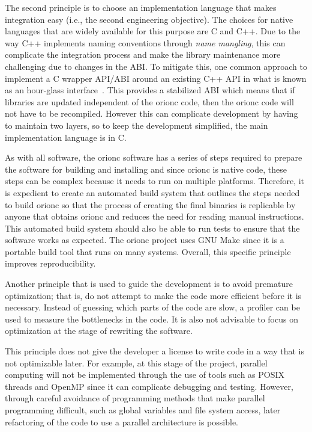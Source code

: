 The second principle is to choose an implementation language that
makes integration easy (i.e., the second engineering objective).
The choices for native languages that are widely available for
this purpose are C and C++. Due to the way C++ implements
naming conventions through \emph{name mangling}, this can
complicate the integration process and make the library
maintenance more challenging due to changes in the \acrshort{ABI}.
To mitigate this, one common approach to implement a C wrapper
\acrshort{API}/\acrshort{ABI} around an existing C++ \acrshort{API}
in what is known as an hour-glass interface~\autocite{CppCon:Hourglass:2014}.
This provides a stabilized \acrshort{ABI} which means that if
libraries are updated independent of the \gls{orionc} code, then
the \gls{orionc} code will not have to be recompiled. However this can
complicate development by having to maintain two layers, so to
keep the development simplified, the main implementation language
is in C.

As with all software, the \gls{orionc} software has a series of
steps required to prepare the software for building and
installing and since \gls{orionc} is native code, these steps can
be complex because it needs to run on multiple platforms. Therefore,
it is expedient to create an automated build system that outlines
the steps needed to build \gls{orionc} so that the process of
creating the final binaries is replicable by anyone that obtains
\gls{orionc} and reduces the need for reading manual instructions.
This automated build system should also be able to run tests to
ensure that the software works as expected. The \gls{orionc}
project uses GNU Make since it is a portable build tool that runs
on many systems. Overall, this specific principle improves
reproducibility.

Another principle that is used to guide the development is to
avoid premature optimization; that is, do not attempt to make the
code more efficient before it is necessary. Instead of guessing
which parts of the code are slow, a profiler can be used to measure the
bottlenecks in the code. It is also not advisable to focus on
optimization at the stage of rewriting the software.

This principle does not give the developer a license to write code in a way
that is not optimizable later. For example, at this stage of the project,
parallel computing will not be implemented through the use of tools such as
POSIX threads and OpenMP since it can complicate debugging and testing.
However, through careful avoidance of programming methods that make parallel
programming difficult, such as global variables and file system access, later
refactoring of the code to use a parallel architecture is possible.

